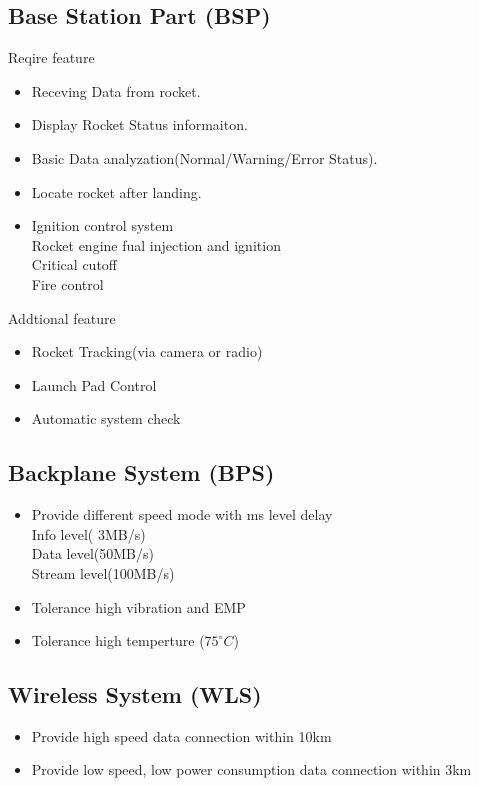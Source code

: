 \documentclass[12pt,article]{memoir}
\begin{document}
\subsection{Base Station Part (BSP)}
Reqire feature
\begin{itemize}
\item Receving Data from rocket.
\item Display Rocket Status informaiton.
\item Basic Data analyzation(Normal/Warning/Error Status).
\item Locate rocket after landing.
\item Ignition control system\\
Rocket engine fual injection and ignition\\
Critical cutoff\\
Fire control\\
\end{itemize}
Addtional feature
\begin{itemize}
\item Rocket Tracking(via camera or radio)
\item Launch Pad Control
\item Automatic system check
\end{itemize}
\subsection{Backplane System (BPS)}
\begin{itemize}
\item Provide different speed mode with ms level delay \\
Info level( \leq 3MB/s)\\
Data level(\approx 50MB/s)\\
Stream level(\geq 100MB/s)
\item Tolerance high vibration and EMP
\item Tolerance high temperture (\leq $75^{\circ}C$)
\end{itemize}
\subsection{Wireless System (WLS)}
\begin{itemize}
\item Provide high speed data connection within 10km
\item Provide low speed, low power consumption data connection within 3km
\end{itemize}
\end{document}
